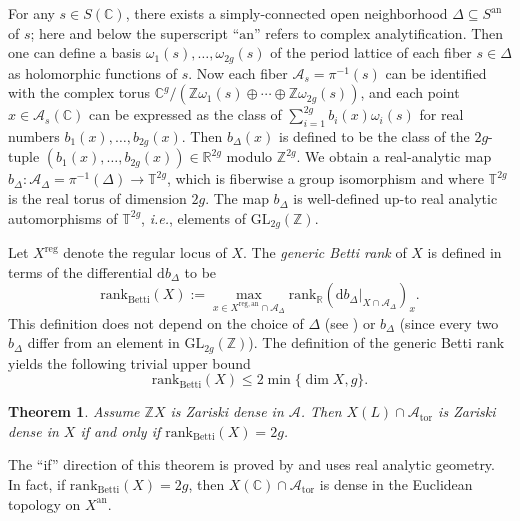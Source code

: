 \documentclass[12pt,oneside]{amsart}
\newcounter{maincounter}
\numberwithin{maincounter}{section}
\numberwithin{equation}{section}
\newtheorem{theorem}[maincounter]{Theorem}
\def\RR{\mathbb{R}}
\def\CC{\mathbb{C}}
\def\ZZ{\mathbb{Z}}
\newcommand{\cal}{\mathcal}
\newcommand{\cA}{\cal{A}}
\newcommand{\IC}{{\CC}}
\newcommand{\IR}{{\RR}}
\newcommand{\IZ}{{\ZZ}}
\begin{document}
For any $s \in S(\IC)$, there exists a simply-connected open neighborhood $\Delta
\subseteq S^{\mathrm{an}}$ of $s$; here and below the superscript
``$\mathrm{an}$'' refers to complex analytification. Then one can define a basis $\omega_1(s),\ldots,\omega_{2g}(s)$ of the period lattice of each fiber $s \in \Delta$ as holomorphic functions of $s$. Now each fiber $\cA_s = \pi^{-1}(s)$ can be identified with the complex torus $\IC^g/\left(\IZ \omega_1(s)\oplus \cdots \oplus \IZ\omega_{2g}(s)\right)$, and each point $x \in \cA_s(\IC)$ can be expressed as the class of $\sum_{i=1}^{2g}b_i(x) \omega_i(s)$ for real numbers $b_1(x),\ldots,b_{2g}(x)$. Then $b_{\Delta}(x)$ is defined to be the class of the $2g$-tuple $(b_1(x),\ldots,b_{2g}(x)) \in \IR^{2g}$ modulo $\IZ^{2g}$.
We obtain a real-analytic map $
b_{\Delta} \colon \cA_{\Delta} = \pi^{-1}(\Delta) \rightarrow \mathbb{T}^{2g}$, 
which is fiberwise a group isomorphism and
where $\mathbb{T}^{2g}$ is the real torus of dimension $2g$. The map
$b_{\Delta}$ is well-defined up-to real analytic automorphisms of
$\mathbb{T}^{2g}$, \textit{i.e.}, elements of $\mathrm{GL}_{2g}(\ZZ)$.

Let $X^{\mathrm{reg}}$ denote the regular locus of $X$.
The \textit{generic Betti rank} of $X$ is defined in terms of the
differential
$\mathrm{d} b_\Delta$ to be
\[
\mathrm{rank}_{\mathrm{Betti}}(X) := \max_{x \in X^{\mathrm{reg,an}}\cap \cA_{\Delta}} \mathrm{rank}_{\RR} (\mathrm{d}b_{\Delta}|_{X\cap \cA_{\Delta}})_x.
\]
This definition does not depend on the choice of $\Delta$ (see \cite[end of $\mathsection$4]{GaoBettiRank}) or $b_{\Delta}$ (since every two $b_{\Delta}$ differ from an element in $\mathrm{GL}_{2g}(\ZZ)$). The definition of the generic Betti rank yields the following trivial upper bound
\begin{equation}\label{EqBettiRank}
\mathrm{rank}_{\mathrm{Betti}}(X) \le 2 \min\{\dim X, g\}.
\end{equation}

\begin{theorem}
  \label{ThmCritTorsionDense}
  Assume $\ZZ X$ is Zariski dense in $\cA$. Then $X(L) \cap \cA_{\mathrm{tor}}$ is Zariski dense in $X$ if and only if $\mathrm{rank}_{\mathrm{Betti}}(X) = 2g$.
\end{theorem}

The ``if'' direction of this theorem is proved by
\cite[Proposition~2.1.1]{ACZBetti} and uses real analytic geometry. In fact, if $\mathrm{rank}_{\mathrm{Betti}}(X) = 2g$, then $X(\IC) \cap \cA_{\mathrm{tor}}$ is dense in the Euclidean topology on $X^{\mathrm{an}}$.
\end{document}
